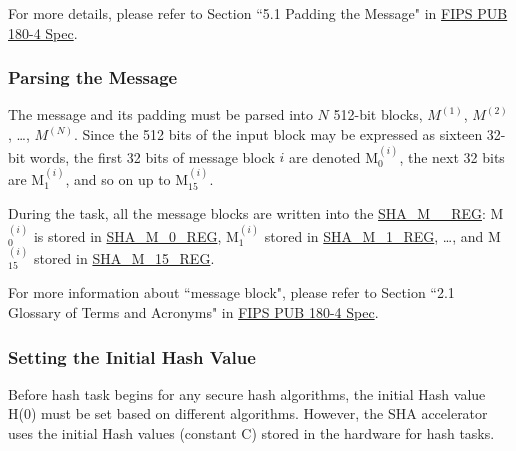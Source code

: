 \documentclass[main\_\_EN.tex]{subfiles}
\begin{document}
For more details, please refer to Section ``5.1 Padding the Message" in \href{https://doi.org/10.6028/NIST.FIPS.180-4}{FIPS PUB 180-4 Spec}.

\subsubsection{Parsing the Message}\label{sec:sha-parsing-msg}

The message and its padding must be parsed into \begin{math}N\end{math} 512-bit blocks, \begin{math}M^{(1)}\end{math}, \begin{math}M^{(2)}\end{math}, \dots, \begin{math}M^{(N)}\end{math}. Since the 512 bits of the input block may be expressed as sixteen 32-bit words, the first 32 bits of message block \begin{math}i\end{math} are denoted M$^{(i)}_{0}$, the next 32 bits are M$^{(i)}_{1}$, and so on up to M$^{(i)}_{15}$.

During the task, all the message blocks are written into the \hyperref[regdesc:SHAMNREG]{SHA\_M\_\_REG}: M$^{(i)}_{0}$ is stored in \hyperref[regdesc:SHAMNREG]{SHA\_M\_0\_REG}, M$^{(i)}_1$ stored in \hyperref[regdesc:SHAMNREG]{SHA\_M\_1\_REG}, \dots, and M$^{(i)}_{15}$ stored in \hyperref[regdesc:SHAMNREG]{SHA\_M\_15\_REG}.

\begin{tiplisting}
\vspace{-0.5em}
For more information about ``message block", please refer to Section ``2.1 Glossary of Terms and Acronyms" in \href{https://doi.org/10.6028/NIST.FIPS.180-4}{FIPS PUB 180-4 Spec}.
\end{tiplisting}

\subsubsection{Setting the Initial Hash Value}\label{sec:sha-set-initial-hash}

Before hash task begins for any secure hash algorithms, the initial Hash value H(0) must be set based on different algorithms. However, the SHA accelerator uses the initial Hash values (constant C) stored in the hardware for hash tasks.  
\end{document}
